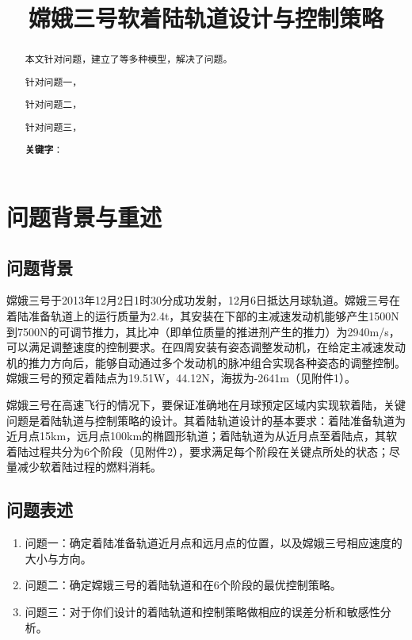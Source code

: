 \documentclass{ctexart}
\title{嫦娥三号软着陆轨道设计与控制策略}
\date{}
\author{}
\begin{document}
\maketitle
\renewcommand{\abstractname}{\Large\textbf{摘要}\\} %
\vspace{-4em} %
\begin{abstract}
\normalsize
本文针对问题，建立了等多种模型，解决了问题。

针对问题一，

针对问题二，

针对问题三，

\textbf{关键字}：
\end{abstract}
\newpage



	\section{问题背景与重述}
	\subsection{问题背景}
    嫦娥三号于2013年12月2日1时30分成功发射，12月6日抵达月球轨道。嫦娥三号在着陆准备轨道上的运行质量为2.4t，其安装在下部的主减速发动机能够产生1500N到7500N的可调节推力，其比冲（即单位质量的推进剂产生的推力）为2940m/s，可以满足调整速度的控制要求。在四周安装有姿态调整发动机，在给定主减速发动机的推力方向后，能够自动通过多个发动机的脉冲组合实现各种姿态的调整控制。嫦娥三号的预定着陆点为19.51W，44.12N，海拔为-2641m（见附件1）。

嫦娥三号在高速飞行的情况下，要保证准确地在月球预定区域内实现软着陆，关键问题是着陆轨道与控制策略的设计。其着陆轨道设计的基本要求：着陆准备轨道为近月点15km，远月点100km的椭圆形轨道；着陆轨道为从近月点至着陆点，其软着陆过程共分为6个阶段（见附件2），要求满足每个阶段在关键点所处的状态；尽量减少软着陆过程的燃料消耗。
    \subsection{问题表述}
    \begin{enumerate}[(1)]
        \item 问题一：确定着陆准备轨道近月点和远月点的位置，以及嫦娥三号相应速度的大小与方向。
        \item 问题二：确定嫦娥三号的着陆轨道和在6个阶段的最优控制策略。
        \item 问题三：对于你们设计的着陆轨道和控制策略做相应的误差分析和敏感性分析。
    \end{enumerate}
\end{document}
